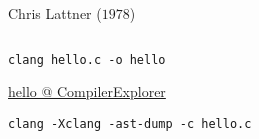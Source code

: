 
\begin{frame}{}
\end{frame}

\begin{frame}{}
	\begin{columns}
			\begin{center}
				Chris Lattner ($1978$)
			\end{center}
	\end{columns}
\end{frame}

\begin{frame}{}

	\vspace{0.50cm}
\end{frame}

\begin{frame}{}
\end{frame}

\begin{frame}{}
	\begin{center}
		\texttt{clang hello.c -o hello}

		\vspace{1.00cm}
		\href{https://godbolt.org/z/Mzv68qn79}{hello @ CompilerExplorer}

		\vspace{1.00cm}
		\texttt{clang -Xclang -ast-dump -c hello.c}
	\end{center}
\end{frame}
